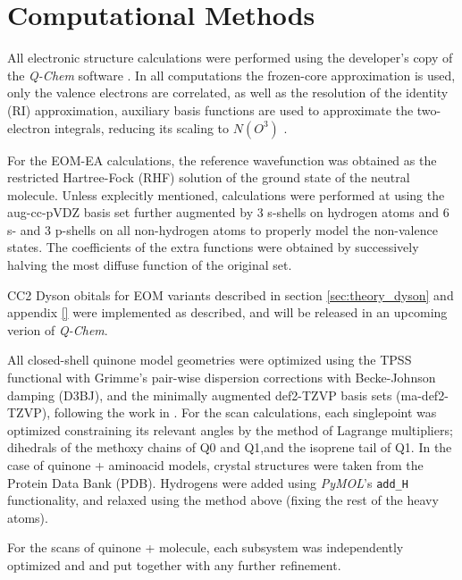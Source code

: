 \chapter{Computational Methods}\label{ch:methods}

All electronic structure calculations were performed using the developer's copy of the \textit{Q-Chem} software \cite{QChem5}. In all computations the frozen-core
approximation is used, only the valence electrons are correlated, as well as the resolution of the identity (RI) approximation, auxiliary basis functions are used to approximate the two-electron integrals, reducing its scaling to $N(O^3)$ \cite{hattig2000cc2}.

For the EOM-EA calculations, the reference wavefunction was obtained as the restricted Hartree-Fock (RHF) solution of the ground state of the neutral molecule. Unless explecitly mentioned, calculations were performed at using the aug-cc-pVDZ basis set \cite{dunning1989gaussian} further augmented by 3 s-shells on hydrogen atoms and 6 s- and 3 p-shells on all non-hydrogen atoms \cite{paran2024performance} to properly model the non-valence states. The coefficients of the extra functions were obtained by successively halving the most diffuse function of the original set.

CC2 Dyson obitals for EOM variants described in section \ref{sec:theory_dyson} and appendix \ref{} were implemented as described, and will be released in an upcoming verion of \textit{Q-Chem}.

All closed-shell quinone model geometries were optimized using the TPSS functional\cite{tao2003climbing} with Grimme's pair-wise dispersion corrections with Becke-Johnson damping (D3BJ)\cite{grimme2011effect}, and the minimally augmented\cite{zheng2011minimally} def2-TZVP basis sets\cite{weigend2005balanced} (ma-def2-TZVP), following the work in \cite{schulz2018systematic}. For the scan calculations, each singlepoint was optimized constraining its relevant angles by the method of Lagrange multipliers; dihedrals of the methoxy chains of Q0 and Q1,and the isoprene tail of Q1.
In the case of quinone + aminoacid models, crystal structures were taken from the Protein Data Bank (PDB). Hydrogens were added using \textit{PyMOL}'s \cite{PyMOL} \texttt{add\_H}  functionality, and relaxed using the method above (fixing the rest of the heavy atoms).

For the scans of quinone + molecule, each subsystem was independently optimized and and put together with any further refinement.

